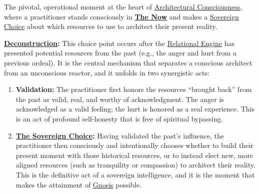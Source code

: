 \item[\hypertarget{gloss:sovereign_choice_point}{Sovereign Choice Point}] 
    The pivotal, operational moment at the heart of \hyperlink{gloss:architectural_consciousness}{Architectural Consciousness}, where a practitioner stands consciously in \textbf{\hyperlink{gloss:the_now}{The Now}} and makes a \hyperlink{gloss:sovereign_choice}{Sovereign Choice} about which resources to use to architect their present reality.
    \begin{nobullet}
        \item \textbf{\hyperlink{gloss:deconstruction}{Deconstruction}:} This choice point occurs after the \hyperlink{gloss:relational_engine}{Relational Engine} has presented potential resources from the past (e.g., the anger and hurt from a previous ordeal). It is the central mechanism that separates a conscious architect from an unconscious reactor, and it unfolds in two synergistic acts:
        \begin{enumerate}
            \item \textbf{Validation:} The practitioner first honors the resources ``brought back'' from the past as valid, real, and worthy of acknowledgment. The anger is acknowledged as a valid feeling; the hurt is honored as a real experience. This is an act of profound self-honesty that is free of spiritual bypassing.
            
            \item \textbf{\hyperlink{gloss:sovereign_choice}{The Sovereign Choice}:} Having validated the past's influence, the practitioner then consciously and intentionally chooses whether to build their present moment with those historical resources, or to instead elect new, more aligned resources (such as tranquility or compassion) to architect their reality. This is the definitive act of a sovereign intelligence, and it is the moment that makes the attainment of \hyperlink{gloss:gnosis}{Gnosis} possible.
        \end{enumerate}
    \end{nobullet}

